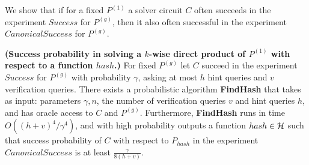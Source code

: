 We show that if for a fixed $P^{(1)}$ a solver circuit $C$ often succeeds in the experiment $Success$ for $P^{(g)}$,
then it also often successful in the experiment $CanonicalSuccess$ for $P^{(g)}$.
%
\begin{lemma}\textbf{(Success probability in solving a $k$-wise direct product of $P^{(1)}$ with respect to a function $hash$.)}
\label{lemma:hash_function_probability}
For fixed $P^{(g)}$ let $C$ succeed in the experiment $Success$ for $P^{(g)}$ with probability $\gamma$,
asking at most $h$ hint queries and $v$ verification queries.
There exists a probabilistic algorithm \textbf{FindHash} that takes as input:
parameters $\gamma, n$, the number of verification queries $v$ and hint queries $h$, and has
oracle access to $C$ and $P^{(g)}$. Furthermore, \textbf{FindHash} runs in time $O((h+v)^4/\gamma^4)$,
and with high probability outputs a function $hash \in \mathcal{H}$
such that success probability of $C$ with respect to $P_{hash}$ in the experiment $CanonicalSuccess$ is at least $\frac{\gamma}{8(h+v)}$.
\end{lemma}
%
